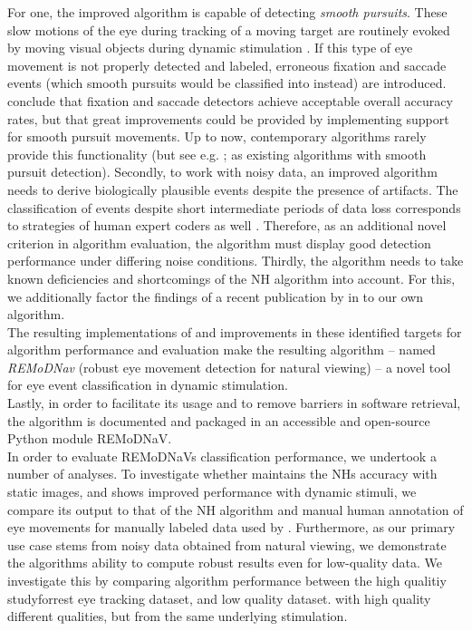 For one, the improved algorithm is capable of detecting \textit{smooth pursuits}. These slow motions of the eye during tracking of a moving target are routinely evoked by moving visual objects during dynamic stimulation \citep{carl1987pursuits}. If this type of eye movement is not properly detected and labeled, erroneous fixation and saccade events (which smooth pursuits would be classified into instead)  are introduced. \cite{Andersson2017} conclude that fixation and saccade detectors achieve acceptable overall accuracy rates, but that great improvements could be provided by implementing support for smooth pursuit movements. Up to now, contemporary algorithms rarely provide this functionality (but see e.g. \cite{LARSSON2015145}; \cite{Komogortsev2013} as existing algorithms with smooth pursuit detection). Secondly, to work with noisy data, an improved algorithm needs to derive biologically plausible events despite the presence of artifacts. The classification of events despite short intermediate periods of data loss corresponds to strategies of human expert coders as well \citep{Hooge2018}. Therefore, as an additional novel criterion in algorithm evaluation, the algorithm must display good detection performance under differing noise conditions. Thirdly, the algorithm needs to take known deficiencies and shortcomings of the NH algorithm into account. For this, we additionally factor the findings of a recent publication by \cite{Friedman2018} in to our own algorithm. \\
The resulting implementations of and improvements in these identified targets for algorithm performance and evaluation make the resulting algorithm -- named \textit{REMoDNav} (robust eye movement detection for natural viewing) -- a novel tool for eye event classification in dynamic stimulation.\\
Lastly, in order to facilitate its usage and to remove barriers in software retrieval, the \remodnav algorithm is documented and packaged in an accessible and open-source Python module REMoDNaV. \\

In order to evaluate REMoDNaVs classification performance, we undertook a number of analyses. To investigate whether \remodnav maintains the NHs accuracy with static images, and shows improved performance with dynamic stimuli, we compare its output to that of the NH algorithm and manual human annotation of eye movements for manually labeled data used by \cite{Andersson2017}. Furthermore, as our primary use case stems from noisy data obtained from natural viewing, we demonstrate the algorithms ability to compute robust results even for low-quality data. We investigate this by comparing algorithm performance between the high qualitiy studyforrest eye tracking dataset, and low quality dataset.
 with high quality different qualities, but from the same underlying stimulation.

